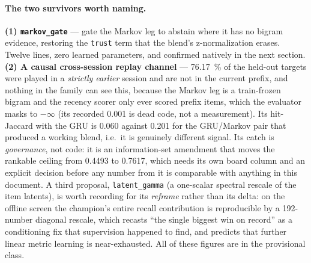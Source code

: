 \documentclass[11pt]{article}
\begin{document}
\paragraph{The two survivors worth naming.} \textbf{(1) \texttt{markov\_gate}} ---
gate the Markov leg to abstain where it has no bigram evidence, restoring the
\texttt{trust} term that the blend's z-normalization erases. Twelve lines,
zero learned parameters, and confirmed natively in the next section.
\textbf{(2) A causal cross-session replay channel} --- \SI{76.17}{\percent} of the
held-out targets were played in a \emph{strictly earlier} session and are not in
the current prefix, and nothing in the family can see this, because the Markov leg
is a train-frozen bigram and the recency scorer only ever scored prefix items,
which the evaluator masks to $-\infty$ (its recorded \num{0.001} is dead code, not
a measurement). Its hit-Jaccard with the GRU is \num{0.060} against \num{0.201}
for the GRU/Markov pair that produced a working blend, i.e.\ it is genuinely
different signal. Its catch is \emph{governance}, not code: it is an
information-set amendment that moves the rankable ceiling from \num{0.4493} to
\num{0.7617}, which needs its own board column and an explicit decision before any
number from it is comparable with anything in this document. A third proposal,
\texttt{latent\_gamma} (a one-scalar spectral rescale of the item latents), is
worth recording for its \emph{reframe} rather than its delta: on the offline
screen the champion's entire recall contribution is reproducible by a
\num{192}-number diagonal rescale, which recasts ``the single biggest win on
record'' as a conditioning fix that supervision happened to find, and predicts
that further linear metric learning is near-exhausted. All of these figures are in
the provisional class.
\end{document}

